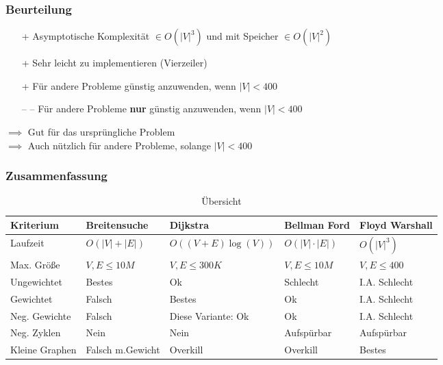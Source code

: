 \begin{frame}
\frametitle{Beurteilung}
\begin{itemize}

\item[+] Asymptotische Komplexität $\in O(|V|^3)$  und mit Speicher $\in O(|V|^2)$
\item[+] Sehr leicht zu implementieren (Vierzeiler)
\item[+] Für andere Probleme günstig anzuwenden, wenn $|V|< 400$
\item[-- --] Für andere Probleme \textbf{nur} günstig anzuwenden, wenn $|V|< 400$
\end{itemize}

$\implies$ Gut für das ursprüngliche Problem\\
$\implies$ Auch nützlich für andere Probleme, solange $|V| < 400$
\end{frame}


\begin{frame}
\frametitle{Zusammenfassung}
\footnotesize{\begin{table}
\begin{tabular}{l l l l l}
\toprule
\textbf{Kriterium} & \textbf{Breitensuche} & \textbf{Dijkstra} & \textbf{Bellman Ford} &\textbf{Floyd Warshall}\\
\midrule
Laufzeit & $O(|V| + |E|)$ & $O((V+E)\log(V))$ & $O(|V| \cdot |E|)$ & $O(|V|^3)$ \\
Max. Größe & $V,E \leq 10M$  & $V,E \leq 300K$ & $V,E \leq 10M$ & $V,E \leq 400$ \\
Ungewichtet & Bestes & Ok & Schlecht & I.A. Schlecht \\
Gewichtet & Falsch & Bestes & Ok & I.A. Schlecht \\
Neg. Gewichte & Falsch & Diese Variante: Ok & Ok & I.A. Schlecht \\
Neg. Zyklen & Nein & Nein & Aufspürbar & Aufspürbar \\
Kleine Graphen & Falsch m.Gewicht & Overkill & Overkill & Bestes \\
\bottomrule
\end{tabular}
\caption{Übersicht}
\end{table}}
\end{frame}

